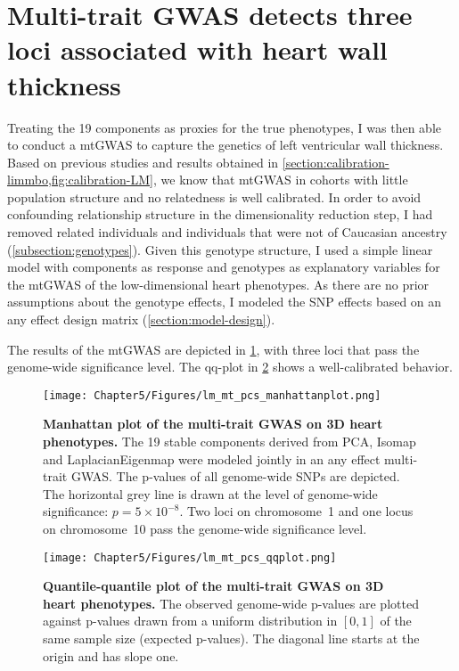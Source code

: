 \section{Multi-trait GWAS detects three loci associated with heart wall thickness}
\label{section:GWAS-3Dheart}
Treating the \num{19} components as proxies for the true phenotypes, I was then able to conduct a mtGWAS to capture the genetics of left ventricular wall thickness. Based on previous studies \citep{Price2006,Patterson2006} and results obtained in \cref{section:calibration-limmbo,fig:calibration-LM}, we know that mtGWAS in cohorts with little population structure and no relatedness is well calibrated. In order to avoid confounding relationship structure in the dimensionality reduction step, I had removed related individuals and individuals that were not of Caucasian ancestry (\cref{subsection:genotypes}). Given this genotype structure, I used a simple linear model with components as response and genotypes as explanatory variables for the mtGWAS of the low-dimensional heart phenotypes. As there are no prior assumptions about the genotype effects, I modeled the SNP effects based on an any effect design matrix (\cref{section:model-design}). 

The results of the mtGWAS are depicted in \cref{fig:manhattan-heart}, with three loci that pass the genome-wide significance level. The qq-plot in \cref{fig:qq-heart} shows a well-calibrated behavior.

\begin{figure}[hbtp]
	\centering
	\texttt{[image: Chapter5/Figures/lm\_mt\_pcs\_manhattanplot.png]}
	\caption[\textbf{Manhattan plot of the multi-trait GWAS on 3D heart phenotypes .}]{\textbf{Manhattan plot of the multi-trait GWAS on 3D heart phenotypes. }The \num{19} stable components derived from PCA, Isomap and LaplacianEigenmap were modeled jointly in an any effect multi-trait GWAS. The p-values of all genome-wide SNPs are depicted. The horizontal grey line is drawn at the level of genome-wide significance: \(p = 5 \times 10^{-8}\). Two loci on chromosome~1 and one locus on chromosome~10 pass the genome-wide significance level.} 
	 	\label{fig:manhattan-heart}
\end{figure}

\begin{figure}[hbtp]
	\centering
	\texttt{[image: Chapter5/Figures/lm\_mt\_pcs\_qqplot.png]}
	\caption[\textbf{Quantile-quantile plot of the multi-trait GWAS on 3D heart phenotypes .}]{\textbf{Quantile-quantile plot of the multi-trait GWAS on 3D heart phenotypes. } The observed genome-wide p-values are plotted against p-values drawn from a uniform distribution in \([0,1]\) of the same sample size (expected p-values). The diagonal line starts at the origin and has slope one.} 
	 	\label{fig:qq-heart}
\end{figure}

